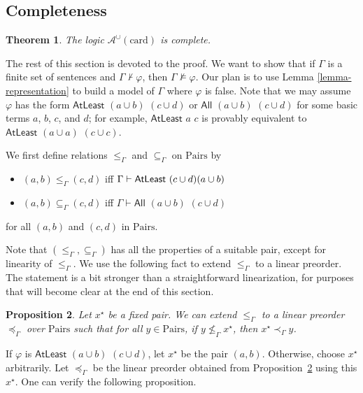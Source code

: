\documentclass[letterpaper]{article} %
\newtheorem{theorem}{Theorem}[section]
\newtheorem{proposition}[theorem]{Proposition}
\theoremstyle{definition}
\newcommand{\proves}{\vdash}
\newcommand{\Aunion}{\mathscr{A}^{\cup}}
\newcommand{\All}[2]{\mathsf{All}\,\,#1\,\,#2}
\newcommand{\Atleast}[2]{\mathsf{AtLeast}\,\,#1\,\,#2}
\newcommand{\card}{\mathrm{card}}
\newcommand{\Pairs}{\mbox{Pairs}}
\newcommand{\provsub}{\subseteq_{\Gamma}}
\newcommand{\provle}{\le_{\Gamma}}
\newcommand{\provextended}{\preceq_{\Gamma}}
\newcommand{\provextendedstrict}{\prec_{\Gamma}}
\begin{document}
\subsection{Completeness}
\label{section-completeness}

\begin{theorem}
The logic $\Aunion(\card)$ is complete.
\label{theorem-completeness-Aunioncard}
\end{theorem}

The rest of this section is devoted to the proof.  We want to show that if $\Gamma$ is a finite set of sentences and $\Gamma \not \proves \varphi$, then $\Gamma \not \models \varphi$.  Our plan is to use Lemma \ref{lemma-representation} to build a model of $\Gamma$ where $\varphi$ is false. Note that we may assume $\varphi$ has the form $\Atleast{(a\cup b)}{(c\cup d)}$ or $\All{(a\cup b)}{(c\cup d)}$ for some basic terms $a$, $b$, $c$, and $d$; for example, $\Atleast{a}{c}$ is provably equivalent to $\Atleast{(a\cup a)}{(c\cup c)}$.

We first define relations $\provle$ and $\provsub$ on $\Pairs$ by

\begin{itemize}%
    \item $(a,b) \provle (c,d)$ iff $\Gamma \vdash  \Atleast{(c \cup d){(a \cup b)}}$
    
    \item $(a,b) \provsub (c,d)$ iff $\Gamma \vdash \All{(a \cup b)}{(c \cup d)}$
\end{itemize}
for all $(a,b)$ and  $(c,d)$ in $\Pairs$.  

Note that $(\provle, \provsub)$ has all the properties of a suitable pair, except for linearity of $\provle$.  We use the following fact to extend $\provle$ to a linear preorder.  The statement is a bit stronger than a straightforward linearization, for purposes that will become clear at the end of this section.

\begin{proposition}
\label{proposition-linearization}
Let $x^\star$ be a fixed pair.  We can extend $\provle$ to a linear preorder $\provextended$ over $\Pairs$ such that for all $y \in \Pairs$, if $y \not \provle x^\star$, then $x^\star \provextendedstrict y$.
\end{proposition}

If $\varphi$ is $\Atleast{(a \cup b)}{(c \cup d)}$, let $x^\star$ be the pair $(a, b)$. Otherwise, choose $x^\star$ arbitrarily. Let $\provextended$ be the linear preorder obtained from Proposition~\ref{proposition-linearization} using this $x^\star$.  One can verify the following proposition.
\end{document}
